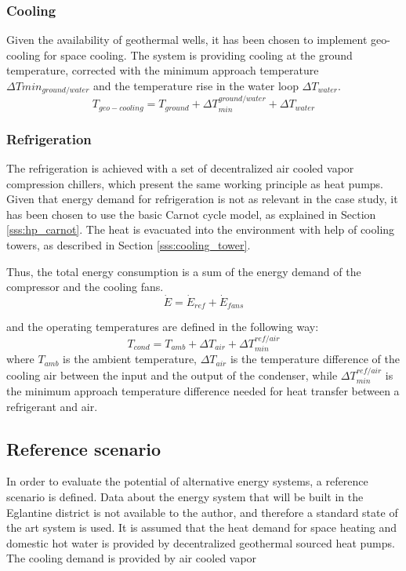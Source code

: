 \documentclass{article}
\begin{document}
\subsubsection{Cooling}
Given the availability of geothermal wells, it has been chosen to implement geo-cooling for space cooling. The system is providing cooling at the ground temperature, corrected with the minimum approach temperature $\Delta Tmin_{ground/water}$ and the temperature rise in the water loop $\Delta T_{water}$.
\begin{equation}
T_{geo-cooling} = T_{ground} + \Delta T_{min}^{ground/water} + \Delta T_{water}
\end{equation}

\subsubsection{Refrigeration}
The refrigeration is achieved with a set of decentralized air cooled vapor compression chillers, which present the same working principle as heat pumps. Given that energy demand for refrigeration is not as relevant in the case study, it has been chosen to use the basic Carnot cycle model, as explained in Section \ref{sss:hp_carnot}. The heat is evacuated into the environment with help of cooling towers, as described in Section \ref{sss:cooling_tower}.

Thus, the total energy consumption is a sum of the energy demand of the compressor and the cooling fans.
\begin{equation}
\dot{E} = \dot{E}_{ref} + \dot{E}_{fans}
\end{equation}

and the operating temperatures are defined in the following way:
\begin{equation}
T_{cond} = T_{amb} + \Delta T_{air} + \Delta T_{min}^{ref/air}
\end{equation}
where $T_{amb}$ is the ambient temperature, $\Delta T_{air}$ is the temperature difference of the cooling air between the input and the output of the condenser, while $\Delta T_{min}^{ref/air}$ is the minimum approach temperature difference needed for heat transfer between a refrigerant and air.\\


\subsection{Reference scenario}
In order to evaluate the potential of alternative energy systems, a reference scenario is defined. Data about the energy system that will be built in the Eglantine district is not available to the author, and therefore a standard state of the art system is used. It is assumed that the heat demand for space heating and domestic hot water is provided by decentralized geothermal sourced heat pumps. The cooling demand is provided by air cooled vapor 
\end{document}
